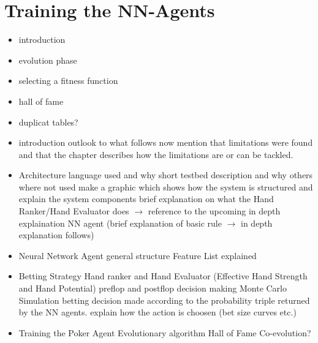 \section{Training the NN-Agents}
\begin{itemize}
\item introduction
\item evolution phase
\item selecting a fitness function
\item hall of fame
\item duplicat tables?
\end{itemize}
\pagebreak
\begin{itemize}
\item introduction
\subitem outlook to what follows now
\subitem mention that limitations were found and that the chapter describes how the limitations are or can be tackled.
\item Architecture
\subitem language used and why
\subitem short testbed description and why others where not used
\subitem make a graphic which shows how the system is structured and explain the system components
\subsubitem brief explanation on what the Hand Ranker/Hand Evaluator does $\rightarrow$ reference to the upcoming in depth explaination
\subsubitem NN agent (brief explanation of basic rule $\rightarrow$ in depth explanation follows)
\item Neural Network Agent
\subitem general structure
\subitem Feature List explained
\item Betting Strategy
\subitem Hand ranker and Hand Evaluator (Effective Hand Strength and Hand Potential)
\subitem preflop and postflop decision making
\subsubitem Monte Carlo Simulation
\subitem betting decision made according to the probability triple returned by the NN agents.
\subsubitem explain how the action is choosen (bet size curves etc.)
\item Training the Poker Agent
\subitem Evolutionary algorithm
\subitem Hall of Fame
\subitem Co-evolution?
\end{itemize}
